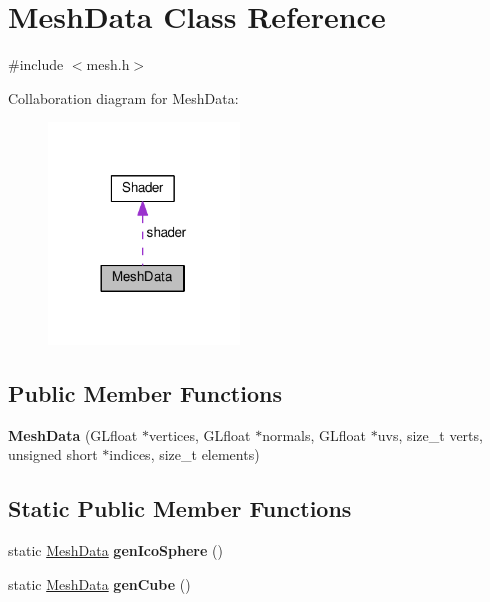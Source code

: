 \hypertarget{class_mesh_data}{}\section{Mesh\+Data Class Reference}
\label{class_mesh_data}


{\ttfamily \#include $<$mesh.\+h$>$}



Collaboration diagram for Mesh\+Data\+:\nopagebreak
\begin{figure}[H]
\begin{center}
\leavevmode
\includegraphics[width=144pt]{class_mesh_data__coll__graph}
\end{center}
\end{figure}
\subsection*{Public Member Functions}
\begin{DoxyCompactItemize}
\item 
\hypertarget{class_mesh_data_a5a1e14216ee9b2162d998f2c2612b94e}{}{\bfseries Mesh\+Data} (G\+Lfloat $\ast$vertices, G\+Lfloat $\ast$normals, G\+Lfloat $\ast$uvs, size\+\_\+t verts, unsigned short $\ast$indices, size\+\_\+t elements)\label{class_mesh_data_a5a1e14216ee9b2162d998f2c2612b94e}

\end{DoxyCompactItemize}
\subsection*{Static Public Member Functions}
\begin{DoxyCompactItemize}
\item 
\hypertarget{class_mesh_data_a1c7e76f9be2d77165d0efa8a1f9e3529}{}static \hyperlink{class_mesh_data}{Mesh\+Data} {\bfseries gen\+Ico\+Sphere} ()\label{class_mesh_data_a1c7e76f9be2d77165d0efa8a1f9e3529}

\item 
\hypertarget{class_mesh_data_a7633222ba1b61c6898a495348c8558fb}{}static \hyperlink{class_mesh_data}{Mesh\+Data} {\bfseries gen\+Cube} ()\label{class_mesh_data_a7633222ba1b61c6898a495348c8558fb}

\end{DoxyCompactItemize}

